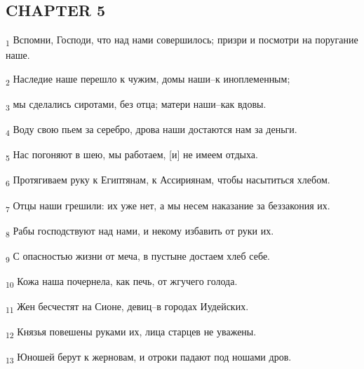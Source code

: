 \subsection{CHAPTER 5}
\begin{tcolorbox}
\textsubscript{1} Вспомни, Господи, что над нами совершилось; призри и посмотри на поругание наше.
\end{tcolorbox}
\begin{tcolorbox}
\textsubscript{2} Наследие наше перешло к чужим, домы наши--к иноплеменным;
\end{tcolorbox}
\begin{tcolorbox}
\textsubscript{3} мы сделались сиротами, без отца; матери наши--как вдовы.
\end{tcolorbox}
\begin{tcolorbox}
\textsubscript{4} Воду свою пьем за серебро, дрова наши достаются нам за деньги.
\end{tcolorbox}
\begin{tcolorbox}
\textsubscript{5} Нас погоняют в шею, мы работаем, [и] не имеем отдыха.
\end{tcolorbox}
\begin{tcolorbox}
\textsubscript{6} Протягиваем руку к Египтянам, к Ассириянам, чтобы насытиться хлебом.
\end{tcolorbox}
\begin{tcolorbox}
\textsubscript{7} Отцы наши грешили: их уже нет, а мы несем наказание за беззакония их.
\end{tcolorbox}
\begin{tcolorbox}
\textsubscript{8} Рабы господствуют над нами, и некому избавить от руки их.
\end{tcolorbox}
\begin{tcolorbox}
\textsubscript{9} С опасностью жизни от меча, в пустыне достаем хлеб себе.
\end{tcolorbox}
\begin{tcolorbox}
\textsubscript{10} Кожа наша почернела, как печь, от жгучего голода.
\end{tcolorbox}
\begin{tcolorbox}
\textsubscript{11} Жен бесчестят на Сионе, девиц--в городах Иудейских.
\end{tcolorbox}
\begin{tcolorbox}
\textsubscript{12} Князья повешены руками их, лица старцев не уважены.
\end{tcolorbox}
\begin{tcolorbox}
\textsubscript{13} Юношей берут к жерновам, и отроки падают под ношами дров.
\end{tcolorbox}
